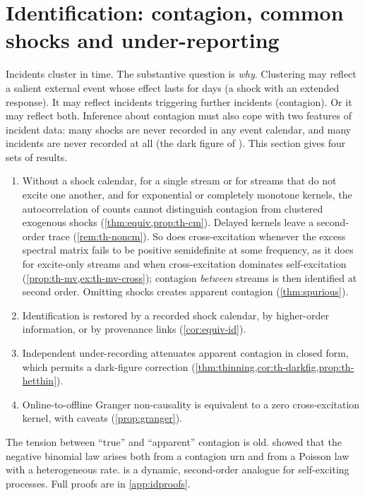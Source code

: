 \section{Identification: contagion, common shocks and under-reporting}\label{sec:identification}

Incidents cluster in time. The substantive question is \emph{why}. Clustering may
reflect a salient external event whose effect lasts for days (a shock with an extended
response). It may reflect incidents triggering further incidents (contagion). Or it
may reflect both. Inference about contagion must also cope with two features of
incident data: many shocks are never recorded in any event calendar, and many incidents
are never recorded at all (the dark figure of \citealp{kornsteinlab2026darkfigure}). This section gives four sets of
results.
\begin{enumerate}[(1)]
  \item Without a shock calendar, for a single stream or for streams that do not excite
    one another, and for exponential or completely monotone kernels, the autocorrelation
    of counts cannot distinguish contagion from clustered exogenous shocks
    (\cref{thm:equiv,prop:th-cm}). Delayed kernels leave a second-order trace
    (\cref{rem:th-noncm}). So does cross-excitation whenever the excess spectral matrix
    fails to be positive semidefinite at some frequency, as it does for excite-only
    streams and when cross-excitation dominates self-excitation
    (\cref{prop:th-mv,ex:th-mv-cross}); contagion \emph{between} streams is then
    identified at second order. Omitting shocks creates apparent contagion
    (\cref{thm:spurious}).
  \item Identification is restored by a recorded shock calendar, by higher-order
    information, or by provenance links (\cref{cor:equiv-id}).
  \item Independent under-recording attenuates apparent contagion in closed form, which
    permits a dark-figure correction (\cref{thm:thinning,cor:th-darkfig,prop:th-hetthin}).
  \item Online-to-offline Granger non-causality is equivalent to a zero cross-excitation
    kernel, with caveats (\cref{prop:granger}).
\end{enumerate}
The tension between ``true'' and ``apparent'' contagion is old. 
showed that the negative binomial law arises both from a contagion urn and from a
Poisson law with a heterogeneous rate.  is a dynamic, second-order
analogue for self-exciting processes. Full proofs are in \cref{app:idproofs}.

